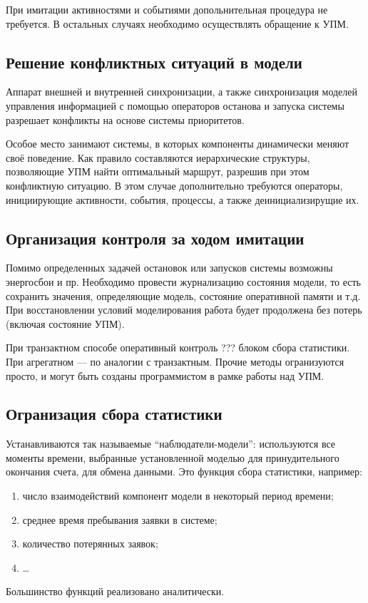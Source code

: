 \documentclass[12pt]{article}
\begin{document}
При имитации активностями и событиями допольнительная процедура не требуется. В остальных случаях необходимо осуществлять обращение к УПМ.

\subsection{Решение конфликтных ситуаций в модели}
Аппарат внешней и внутренней синхронизации, а также синхронизация моделей управления информацией с помощью операторов останова и запуска системы разрешает конфликты на основе системы приоритетов.

Особое место занимают системы, в которых компоненты динамически меняют своё поведение. Как правило составляются иерархические структуры, позволяющие УПМ найти оптимальный маршрут, разрешив при этом конфликтную ситуацию. В этом случае дополнительно требуются операторы, инициирующие активности, события, процессы, а также деинициализирущие их.

\subsection{Организация контроля за ходом имитации}
Помимо определенных задачей остановок или запусков системы возможны энергосбои и пр. Необходимо провести журнализацию состояния модели, то есть сохранить значения, определяющие модель, состояние оперативной памяти и т.д. При восстановлении условий моделирования работа будет продолжена без потерь (включая состояние УПМ).

При транзактном способе оперативный контроль ??? блоком сбора статистики. При агрегатном --- по аналогии с транзактным. Прочие методы огранизуются просто, и могут быть созданы программистом в рамке работы над УПМ.

\subsection{Огранизация сбора статистики}
Устанавливаются так называемые \enquote{наблюдатели-модели}: используются все моменты времени, выбранные установленной моделью для принудительного окончания счета, для обмена данными. Это функция сбора статистики, например:
\begin{enumerate}
    \item число взаимодействий компонент модели в некоторый период времени;
    \item среднее время пребывания заявки в системе;
    \item количество потерянных заявок;
    \item \ldots
\end{enumerate}
Большинство функций реализовано аналитически.\\
\end{document}
